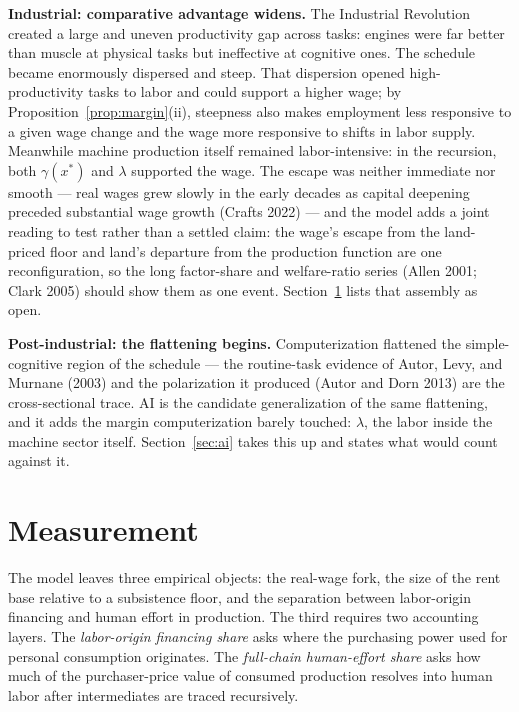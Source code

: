 \documentclass[12pt]{article}
\theoremstyle{plain}
\begin{document}
\textbf{Industrial: comparative advantage widens.} The Industrial Revolution created a large and uneven productivity gap across tasks: engines were far better than muscle at physical tasks but ineffective at cognitive ones. The schedule became enormously dispersed and steep. That dispersion opened high-productivity tasks to labor and could support a higher wage; by Proposition~\ref{prop:margin}(ii), steepness also makes employment less responsive to a given wage change and the wage more responsive to shifts in labor supply. Meanwhile machine production itself remained labor-intensive: in the recursion, both $\gamma (x^*)$ and $\lambda$ supported the wage. The escape was neither immediate nor smooth --- real wages grew slowly in the early decades as capital deepening preceded substantial wage growth (Crafts 2022) --- and the model adds a joint reading to test rather than a settled claim: the wage's escape from the land-priced floor and land's departure from the production function are one reconfiguration, so the long factor-share and welfare-ratio series (Allen 2001; Clark 2005) should show them as one event. Section~\ref{sec:measurement} lists that assembly as open.

\textbf{Post-industrial: the flattening begins.} Computerization flattened the simple-cognitive region of the schedule --- the routine-task evidence of Autor, Levy, and Murnane (2003) and the polarization it produced (Autor and Dorn 2013) are the cross-sectional trace. AI is the candidate generalization of the same flattening, and it adds the margin computerization barely touched: $\lambda$, the labor inside the machine sector itself. Section~\ref{sec:ai} takes this up and states what would count against it.

\section{Measurement}\label{sec:measurement}

The model leaves three empirical objects: the real-wage fork, the size of the rent base relative to a subsistence floor, and the separation between labor-origin financing and human effort in production. The third requires two accounting layers. The \emph{labor-origin financing share} asks where the purchasing power used for personal consumption originates. The \emph{full-chain human-effort share} asks how much of the purchaser-price value of consumed production resolves into human labor after intermediates are traced recursively.
\end{document}
